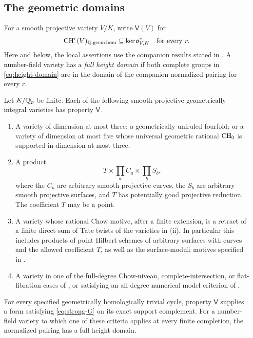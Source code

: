 \subsection{The geometric domains}

For a smooth projective variety $V/K$, write $\mathsf V(V)$ for
\[
 \operatorname{CH}^r(V)_{\mathbb Q,\mathrm{geom\,hom}}\subseteq\ker\mathfrak o^r_{V,K}
 \quad\text{for every }r.
\]
Here and below, the local assertions use the companion results stated in
. A number-field variety has a \emph{full height
domain} if both complete groups in \eqref{eq:height-domain} are in the
domain of the companion normalized pairing for every $r$.

\begin{theorem}\label{thm:geometric-domains}
Let $K/\mathbb Q_p$ be finite. Each of the following smooth projective
geometrically integral varieties has property $\mathsf V$.
\begin{enumerate}[label=\textup{(\roman*)}]
\item A variety of dimension at most three; a geometrically uniruled
fourfold; or a variety of dimension at most five whose universal
geometric rational $\operatorname{CH}_0$ is supported in dimension at most three.
\item A product
\[
 T\times\prod_a C_a\times\prod_b S_b,
\]
where the $C_a$ are arbitrary smooth projective curves, the $S_b$ are
arbitrary smooth projective surfaces, and $T$ has potentially good
projective reduction. The coefficient $T$ may be a point.
\item A variety whose rational Chow motive, after a finite extension,
is a retract of a finite direct sum of Tate twists of the varieties in
\textup{(ii)}. In particular this includes products of point Hilbert
schemes of arbitrary surfaces with curves and the allowed coefficient
$T$, as well as the surface-moduli motives specified in
.
\item A variety in one of the full-degree Chow-niveau, complete-intersection,
or flat-fibration cases of , or satisfying an
all-degree numerical model criterion of .
\end{enumerate}
For every specified geometrically homologically trivial cycle, property
$\mathsf V$ supplies a form satisfying \eqref{eq:strong-G} on its exact
support complement. For a number-field variety to which one of these
criteria applies at every finite completion, the normalized pairing has
a full height domain.
\end{theorem}

